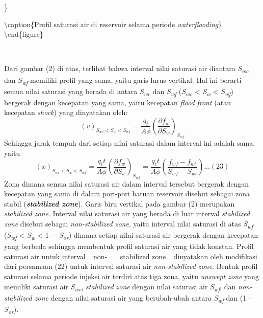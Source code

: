 \documentclass[
]{book}
\begin{document}
\}

\textbackslash caption\{Profil saturasi air di reservoir selama periode \emph{waterflooding}\}\label{fig:unnamed-chunk-48}
\textbackslash end\{figure\}

~

Dari gambar (2) di atas, terlihat bahwa interval nilai saturasi air diantara \emph{S\textsubscript{wc}} dan \emph{S\textsubscript{wf}} memiliki profil yang sama, yaitu garis lurus vertikal. Hal ini berarti semua nilai saturasi yang berada di antara \emph{S\textsubscript{wc}} dan \emph{S\textsubscript{wf}} (\emph{S\textsubscript{wc}} \textless{} \emph{S\textsubscript{w}} \textless{} \emph{S\textsubscript{wf}}) bergerak dengan kecepatan yang sama, yaitu kecepatan \emph{flood} \emph{front} (atau kecepatan \emph{shock}) yang dinyatakan oleh:
\[(v)_{S_{wc} < S_w < S_{wf}} = \frac{q_t}{A\phi} \left( \frac{\partial f_w}{\partial S_w} \right)_{S_{wf}}\]
Sehingga jarak tempuh dari setiap nilai saturasi dalam interval ini adalah sama, yaitu
\[(x)_{S_{wc} < S_w < S_{wf}} = \frac{q_tt}{A\phi} \left( \frac{\partial f_w}{\partial S_w} \right)_{S_{wf}} = \frac{q_tt}{A\phi} \left( \frac{f_{wf} - f_{wi}}{S_{wf} - S_{wi}} \right)...(23)\]
Zona dimana semua nilai saturasi air dalam interval tersebut bergerak dengan kecepatan yang sama di dalam pori-pori batuan reservoir disebut sebagai zona stabil (\textbf{\emph{stabilized zone}}). Garis biru vertikal pada gambar (2) merupakan \emph{stabilized zone}. Interval nilai saturasi air yang berada di luar interval \emph{stabilized zone} disebut sebagai \emph{non-stabilized zone}, yaitu interval nilai saturasi di atas \emph{S\textsubscript{wf}} (\emph{S\textsubscript{wf}} \textless{} \emph{S\textsubscript{w}} \textless{} 1 − \emph{S\textsubscript{or}}) dimana setiap nilai saturasi air bergerak dengan kecepatan yang berbeda sehingga membentuk profil saturasi air yang tidak konstan. Profil saturasi air untuk interval \_non- \_\_stabilized zone\_ dinyatakan oleh modifikasi dari persamaan (22) untuk interval saturasi air \emph{non-stabilized zone}. Bentuk profil saturasi selama periode injeksi air terdiri atas tiga zona, yaitu \emph{unswept zone} yang memiliki saturasi air \emph{S\textsubscript{wc}}, \emph{stabilized} \emph{zone} dengan nilai saturasi air \emph{S\textsubscript{wf}}, dan \emph{non-stabilized zone} dengan nilai saturasi air yang berubah-ubah antara \emph{S\textsubscript{wf}} dan (1 -- \emph{S\textsubscript{or}}).
\end{document}

